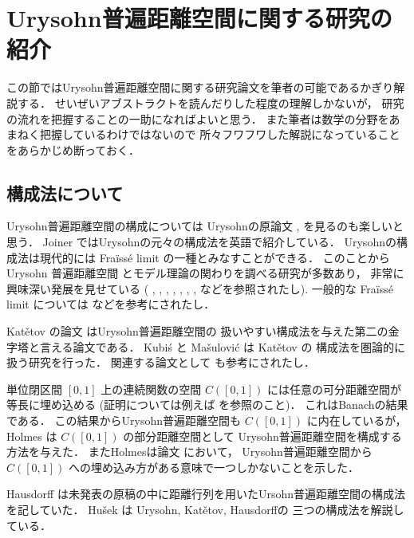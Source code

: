 \documentclass[leqno, 12pt]{jsarticle}
\begin{document}
\newpage
\section{Urysohn普遍距離空間に関する研究の紹介}\label{sec:shoukai}

この節ではUrysohn普遍距離空間に関する研究論文を筆者の可能であるかぎり解説する．
せいぜいアブストラクトを読んだりした程度の理解しかないが，
研究の流れを把握することの一助になればよいと思う．
また筆者は数学の分野をあまねく把握しているわけではないので
所々フワフワした解説になっていることをあらかじめ断っておく．
\subsection{構成法について}
Urysohn普遍距離空間の構成については
Urysohnの原論文 
\cite{Ury1}, 
\cite{Ury2}
を見るのも楽しいと思う．
Joiner 
\cite{J}
ではUrysohnの元々の構成法を英語で紹介している．
Urysohnの構成法は現代的には
Fra\"{i}ss\'{e} limit
の一種とみなすことができる．
このことから
Urysohn
普遍距離空間
とモデル理論の関わりを調べる研究が多数あり，
非常に興味深い発展を見せている
( \cite{CT}, 
\cite{conantthesis}, 
\cite{conant},
\cite{conant2}, 
\cite{CL}, 
\cite{Hub}, 
\cite{KT}, 
\cite{TZ}
などを参照されたし). 
一般的な
Fra\"{i}ss\'{e} limit
については
 \cite{Hodges}
 などを参考にされたし．




Kat\v{e}tov
の論文 
\cite{Ka}
はUrysohn普遍距離空間の
扱いやすい構成法を与えた第二の金字塔と言える論文である．
Kubi\'{s}
と
Ma\v{s}ulovi\'{c} 
\cite{KM}
は
Kat\v{e}tov
の
構成法を圏論的に扱う研究を行った．
関連する論文として 
\cite{Gre}
も参考にされたし．



単位閉区間
$[0, 1]$
上の連続関数の空間
$C([0, 1])$
には任意の可分距離空間が等長に埋め込める 
(証明については例えば  
\cite{Hei}を参照のこと)．
これはBanachの結果である．
この結果からUrysohn普遍距離空間も
$C([0, 1])$
に内在しているが，
Holmes 
\cite{Holmos}
は
$C([0, 1])$
の部分距離空間として
Urysohn普遍距離空間を構成する方法を与えた．
またHolmesは論文 
\cite{Holmes2}
において，
Urysohn普遍距離空間から
$C([0, 1])$
への埋め込み方がある意味で一つしかないことを示した．



Hausdorff
 \cite{Ha}
 は未発表の原稿の中に距離行列を用いたUrsohn普遍距離空間の構成法を記していた．
Hu\v{s}ek
 \cite{Hu}
 は
 Urysohn, Kat\v{e}tov,
  Hausdorffの
  三つの構成法を解説している．
\end{document}
